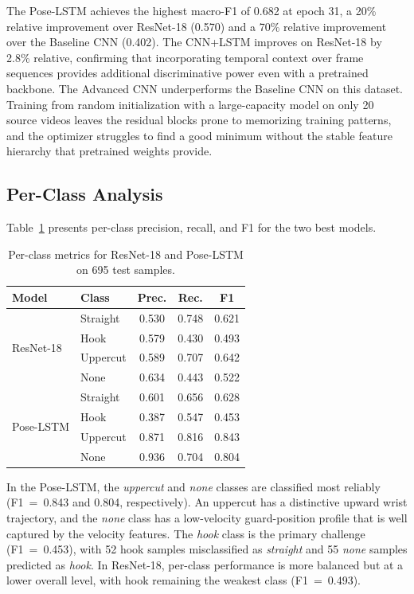 \documentclass[conference]{IEEEtran}
\begin{document}
The Pose-LSTM achieves the highest macro-F1 of 0.682 at epoch 31, a 20\%
relative improvement over ResNet-18 (0.570) and a 70\% relative improvement
over the Baseline CNN (0.402). The CNN+LSTM improves on ResNet-18 by 2.8\%
relative, confirming that incorporating temporal context over frame sequences
provides additional discriminative power even with a pretrained backbone. The
Advanced CNN underperforms the Baseline CNN on this dataset. Training from
random initialization with a large-capacity model on only 20 source videos
leaves the residual blocks prone to memorizing training patterns, and the
optimizer struggles to find a good minimum without the stable feature
hierarchy that pretrained weights provide.

\subsection{Per-Class Analysis}

Table~\ref{tab:perclass} presents per-class precision, recall, and F1 for the
two best models.

\begin{table}[h]
\centering
\caption{Per-class metrics for ResNet-18 and Pose-LSTM on 695 test samples.}
\label{tab:perclass}
\begin{tabular}{llccc}
\toprule
\textbf{Model} & \textbf{Class} & \textbf{Prec.} & \textbf{Rec.} &
\textbf{F1} \\
\midrule
\multirow{4}{*}{ResNet-18}
  & Straight  & 0.530 & 0.748 & 0.621 \\
  & Hook      & 0.579 & 0.430 & 0.493 \\
  & Uppercut  & 0.589 & 0.707 & 0.642 \\
  & None      & 0.634 & 0.443 & 0.522 \\
\midrule
\multirow{4}{*}{Pose-LSTM}
  & Straight  & 0.601 & 0.656 & 0.628 \\
  & Hook      & 0.387 & 0.547 & 0.453 \\
  & Uppercut  & 0.871 & 0.816 & 0.843 \\
  & None      & 0.936 & 0.704 & 0.804 \\
\bottomrule
\end{tabular}
\end{table}

In the Pose-LSTM, the \textit{uppercut} and \textit{none} classes are
classified most reliably (F1~=~0.843 and 0.804, respectively). An uppercut
has a distinctive upward wrist trajectory, and the \textit{none} class has a
low-velocity guard-position profile that is well captured by the velocity
features. The \textit{hook} class is the primary challenge (F1~=~0.453), with
52 hook samples misclassified as \textit{straight} and 55 \textit{none}
samples predicted as \textit{hook}. In ResNet-18, per-class performance is
more balanced but at a lower overall level, with hook remaining the weakest
class (F1~=~0.493).
\end{document}
